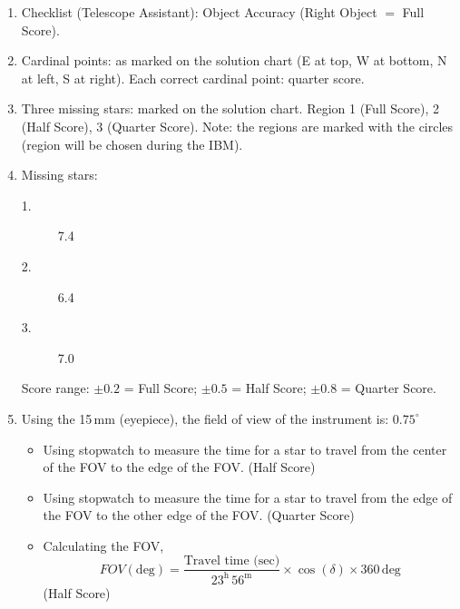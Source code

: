 \begin{enumerate}
\item Checklist (Telescope Assistant): Object Accuracy (Right Object $=$
Full Score).

\item Cardinal points: as marked on the solution chart (E at top, W at
bottom, N at left, S at right). Each correct cardinal point: quarter score.

\item Three missing stars: marked on the solution chart. Region 1 (Full
Score), 2 (Half Score), 3 (Quarter Score). Note: the regions are marked
with the circles (region will be chosen during the IBM).


\item Missing stars:
\begin{description}
\item[1.] 7.4
\item[2.] 6.4
\item[3.] 7.0
\end{description}
Score range: $\pm 0.2$ = Full Score; $\pm 0.5$ = Half Score;
$\pm 0.8$ = Quarter Score.

\item Using the 15\,mm (eyepiece), the field of view of the instrument is:
$0.75^\circ$
\begin{itemize}
\item Using stopwatch to measure the time for a star to travel from the
  center of the FOV to the edge of the FOV. \hfill(Half Score)
\item Using stopwatch to measure the time for a star to travel from the
  edge of the FOV to the other edge of the FOV. \hfill(Quarter Score)
\item Calculating the FOV,
\[ FOV(\mathrm{deg}) = \frac{\text{Travel time (sec)}}{23^{\mathrm{h}}\,56^{\mathrm{m}}}
   \times \cos(\delta) \times 360\,\mathrm{deg} \]
\hfill(Half Score)
\end{itemize}
\end{enumerate}
